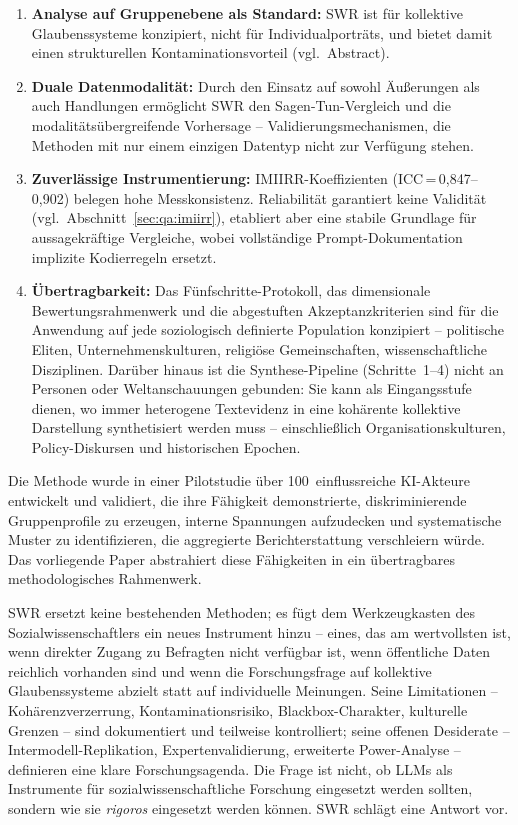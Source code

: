 \documentclass[11pt,a4paper]{article}
\begin{document}
\begin{enumerate}[nosep]
  \item \textbf{Analyse auf Gruppenebene als Standard:} SWR ist f\"ur kollektive Glaubenssysteme konzipiert, nicht f\"ur Individualportr\"ats, und bietet damit einen strukturellen Kontaminationsvorteil (vgl.\ Abstract).
  \item \textbf{Duale Datenmodalit\"at:} Durch den Einsatz auf sowohl \"Au\ss{}erungen als auch Handlungen erm\"oglicht SWR den Sagen-Tun-Vergleich und die modalit\"ats\"ubergreifende Vorhersage -- Validierungsmechanismen, die Methoden mit nur einem einzigen Datentyp nicht zur Verf\"ugung stehen.
  \item \textbf{Zuverl\"assige Instrumentierung:} IMIIRR-Koeffizienten (ICC\,=\,0,847--0,902) belegen hohe Messkonsistenz. Reliabilit\"at garantiert keine Validit\"at (vgl.\ Abschnitt~\ref{sec:qa:imiirr}), etabliert aber eine stabile Grundlage f\"ur aussagekr\"aftige Vergleiche, wobei vollst\"andige Prompt-Dokumentation implizite Kodierregeln ersetzt.
  \item \textbf{\"Ubertragbarkeit:} Das F\"unfschritte-Protokoll, das dimensionale Bewertungsrahmenwerk und die abgestuften Akzeptanzkriterien sind f\"ur die Anwendung auf jede soziologisch definierte Population konzipiert -- politische Eliten, Unternehmenskulturen, religi\"ose Gemeinschaften, wissenschaftliche Disziplinen. Dar\"uber hinaus ist die Synthese-Pipeline (Schritte~1--4) nicht an Personen oder Weltanschauungen gebunden: Sie kann als Eingangsstufe dienen, wo immer heterogene Textevidenz in eine koh\"arente kollektive Darstellung synthetisiert werden muss -- einschlie\ss{}lich Organisationskulturen, Policy-Diskursen und historischen Epochen.
\end{enumerate}

Die Methode wurde in einer Pilotstudie \"uber 100~einflussreiche KI-Akteure \citep{Geiger2026PaperA} entwickelt und validiert, die ihre F\"ahigkeit demonstrierte, diskriminierende Gruppenprofile zu erzeugen, interne Spannungen aufzudecken und systematische Muster zu identifizieren, die aggregierte Berichterstattung verschleiern w\"urde. Das vorliegende Paper abstrahiert diese F\"ahigkeiten in ein \"ubertragbares methodologisches Rahmenwerk.

SWR ersetzt keine bestehenden Methoden; es f\"ugt dem Werkzeugkasten des Sozialwissenschaftlers ein neues Instrument hinzu -- eines, das am wertvollsten ist, wenn direkter Zugang zu Befragten nicht verf\"ugbar ist, wenn \"offentliche Daten reichlich vorhanden sind und wenn die Forschungsfrage auf kollektive Glaubenssysteme abzielt statt auf individuelle Meinungen. Seine Limitationen -- Koh\"arenzverzerrung, Kontaminationsrisiko, Blackbox-Charakter, kulturelle Grenzen -- sind dokumentiert und teilweise kontrolliert; seine offenen Desiderate -- Intermodell-Replikation, Expertenvalidierung, erweiterte Power-Analyse -- definieren eine klare Forschungsagenda. Die Frage ist nicht, ob LLMs als Instrumente f\"ur sozialwissenschaftliche Forschung eingesetzt werden sollten, sondern wie sie \emph{rigoros} eingesetzt werden k\"onnen. SWR schl\"agt eine Antwort vor.
\end{document}
